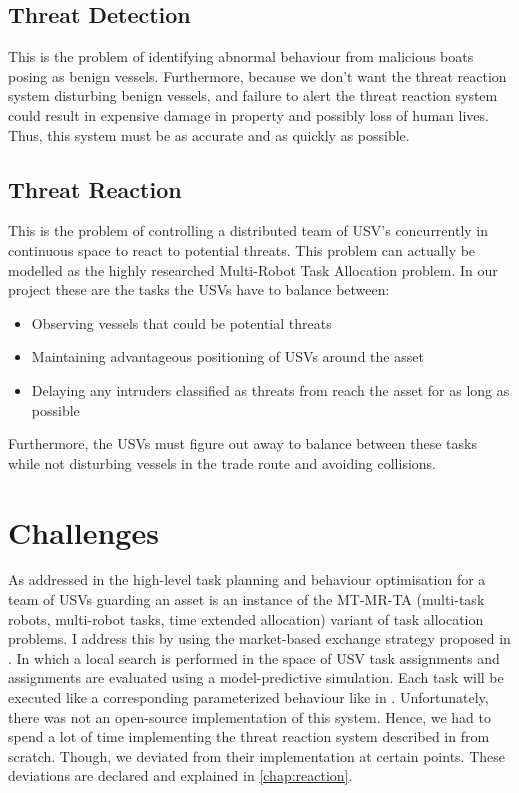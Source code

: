 \documentclass[bsc,frontabs,twoside,singlespacing,parskip,deptreport]{infthesis}     %
\begin{document}
\subsection{Threat Detection}
This is the problem of identifying abnormal behaviour from malicious boats posing as benign vessels. Furthermore, because we don't want the threat reaction system disturbing benign vessels, and failure to alert the threat reaction system could result in expensive damage in property and possibly loss of human lives. Thus, this system must be as accurate and as quickly as possible. 

\subsection{Threat Reaction}
This is the problem of controlling a distributed team of USV's concurrently in continuous space to react to potential threats. This problem can actually be modelled as the highly researched Multi-Robot Task Allocation problem. In our project these are the tasks the USVs have to balance between:
\begin{itemize}
    \item Observing vessels that could be potential threats
    \item Maintaining advantageous positioning of USVs around the asset
    \item Delaying any intruders classified as threats from reach the asset for as long as possible
\end{itemize}
Furthermore, the USVs must figure out away to balance between these tasks while not disturbing \nonthreatening vessels in the trade route and avoiding collisions.

\section{Challenges}
As addressed in \cite{raboin2013model} the high-level task planning and behaviour optimisation for a team of USVs guarding an asset is an instance of the MT-MR-TA (multi-task robots, multi-robot tasks, time extended allocation) variant of task allocation problems. I address this by using the market-based exchange strategy proposed in \cite{raboin2013model}. In which a local search is performed in the space of USV task assignments and assignments are evaluated using a model-predictive simulation. Each task will be executed like a corresponding parameterized behaviour like in \cite{raboin2013model}.
Unfortunately, there was not an open-source implementation of this system. Hence, we had to spend a lot of time implementing the threat reaction system described in \citep{raboin2013model} from scratch. Though, we deviated from their implementation at certain points. These deviations are declared and explained in \ref{chap:reaction}.
\end{document}
